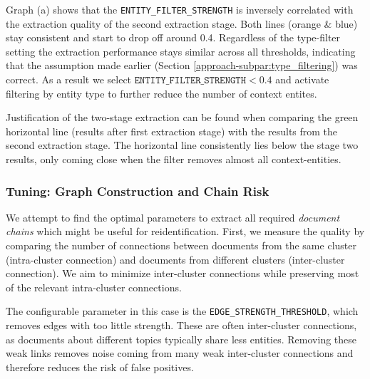 Graph (a) shows that the \texttt{ENTITY\_FILTER\_STRENGTH} is inversely correlated with the extraction quality of the second extraction stage. Both lines (orange \& blue) stay consistent and start to drop off around 0.4. Regardless of the type-filter setting the extraction performance stays similar across all thresholds, indicating that the assumption made earlier (Section \ref{approach-subpar:type_filtering}) was correct. As a result we select $\texttt{ENTITY\_FILTER\_STRENGTH} < 0.4$ and activate filtering by entity type to further reduce the number of context entites.

Justification of the two-stage extraction can be found when comparing the green horizontal line (results after first extraction stage) with the results from the second extraction stage. The horizontal line consistently lies below the stage two results, only coming close when the filter removes almost all context-entities. 

\subsubsection{Tuning: Graph Construction and Chain Risk}
We attempt to find the optimal parameters to extract all required \textit{document chains} which might be useful for reidentification. First, we measure the quality by comparing the number of connections between documents from the same cluster (intra-cluster connection) and documents from different clusters (inter-cluster connection). We aim to minimize inter-cluster connections while preserving most of the relevant intra-cluster connections.

The configurable parameter in this case is the \texttt{EDGE\_STRENGTH\_THRESHOLD}, which removes edges with too little strength. These are often inter-cluster connections, as documents about different topics typically share less entities. Removing these weak links 
removes noise coming from many weak inter-cluster connections and therefore reduces the risk of false positives.

